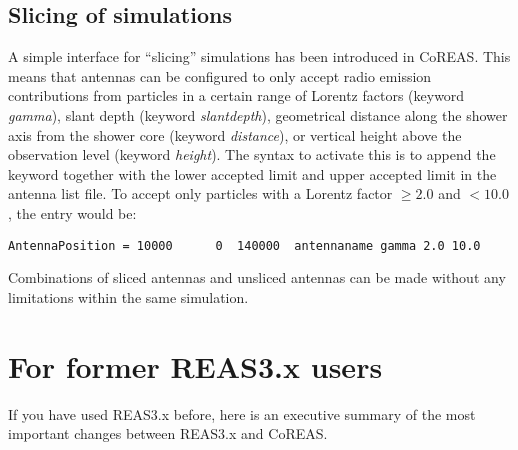 \documentclass[a4paper,10pt]{article}
\begin{document}


\subsection{Slicing of simulations}

A simple interface for ``slicing'' simulations has been introduced in CoREAS. This means that antennas can be configured to only accept radio emission contributions from particles in a certain range of Lorentz factors (keyword \emph{gamma}), slant depth (keyword \emph{slantdepth}), geometrical distance along the shower axis from the shower core (keyword \emph{distance}), or vertical height above the observation level (keyword \emph{height}). The syntax to activate this is to append the keyword together with the lower accepted limit and upper accepted limit in the antenna list file. To accept only particles with a Lorentz factor $\geq 2.0$ and $< 10.0$, the entry would be:

\begin{verbatim}
AntennaPosition = 10000      0  140000  antennaname gamma 2.0 10.0
\end{verbatim}

Combinations of sliced antennas and unsliced antennas can be made without any limitations within the same simulation.

\section{For former REAS3.x users}

If you have used REAS3.x before, here is an executive summary of the most important changes between REAS3.x and CoREAS.\\ \\
\end{document}
